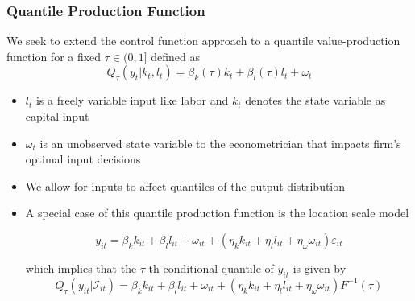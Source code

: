 \documentclass{beamer}
\begin{document}

\begin{frame}
\frametitle{Quantile Production Function}
We seek to extend the control function approach to a quantile value-production function for a fixed $\tau\in(0,1]$ defined as
\begin{equation}
	Q_{\tau}(y_{t}|k_{t}, l_{t})=\beta_{k}(\tau)k_{t}+\beta_{l}(\tau)l_{t}+\omega_{t}
\end{equation}

\begin{itemize}
	\item $l_{t}$ is a freely variable input like labor and $k_{t}$ denotes the state variable as capital input
	\item $\omega_{t}$ is an unobserved state variable to the econometrician that impacts firm's optimal input decisions
	\item We allow for inputs to affect quantiles of the output distribution
	\item A special case of this quantile production function is the location scale model
	
	\begin{equation}
	 y_{it}=\beta_{k}k_{it}+\beta_{l}l_{it}+\omega_{it}+(\eta_{k}k_{it}+\eta_{l}l_{it}+\eta_{\omega}\omega_{it})\varepsilon_{it}
	\end{equation}
	
	which implies that the $\tau$-th conditional quantile of $y_{it}$ is given by
	\begin{equation}
	Q_{\tau}(y_{it}|\mathcal{I}_{it})=\beta_{k}k_{it}+\beta_{l}l_{it}+\omega_{it}+(\eta_{k}k_{it}+\eta_{l}l_{it}+\eta_{\omega}\omega_{it})F^{-1}(\tau)
	\end{equation}
\end{itemize}
\end{frame}
\end{document}
